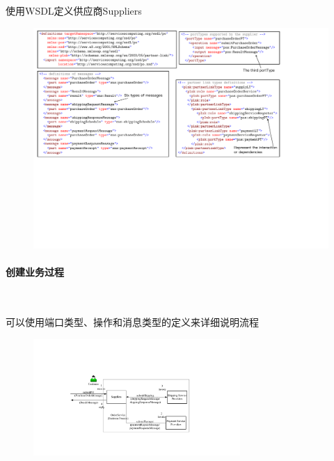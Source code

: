 使用WSDL定义供应商Suppliers
\begin{figure}[H]
    \vspace{-0.7em}
	\centering
	\includegraphics[width=\textwidth]{images/创建服务描述2.pdf}
    \vspace{-5.5em}
\end{figure}

\paragraph*{创建业务过程}~{} \par
可以使用端口类型、操作和消息类型的定义来详细说明流程
\begin{figure}[H]
    \vspace{-0.5em}
	\centering
	\includegraphics[width=0.7\textwidth]{images/创建业务过程.pdf}
    \vspace{-1em}
\end{figure}

